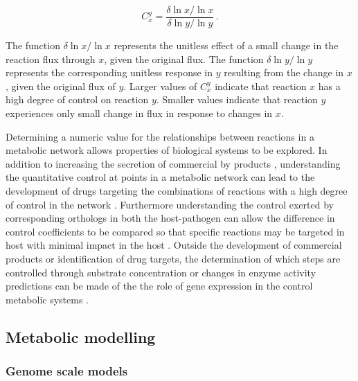 \begin{equation}\label{fcc}
C_{x}^{y} = \frac{ \delta \ln x / \ln x}{\delta \ln y / \ln y} \, .
\end{equation}

The function $\delta \ln x / \ln x$ represents the unitless effect of a small change in the reaction flux through $x$, given the original flux. The function $\delta \ln y / \ln y$ represents the corresponding unitless response in $y$ resulting from the change in $x$, given the original flux of $y$. Larger values of $C_{x}^{y}$ indicate that reaction $x$ has a high degree of control on reaction $y$. Smaller values indicate that reaction $y$ experiences only small change in flux in response to changes in $x$.


Determining a numeric value for the relationships between reactions in a metabolic network allows properties of biological systems to be explored. In addition to increasing the secretion of commercial by products \cite{niederberger1992}, understanding the quantitative control at points in a metabolic network can lead to the development of drugs targeting the combinations of reactions with a high degree of control in the network \cite{lehar2008,hopkins2008}. Furthermore understanding the control exerted by corresponding orthologs in both the host-pathogen can allow the difference in control coefficients to be compared so that specific reactions may be targeted in host with minimal impact in the host \cite{hornberg2007}. Outside the development of commercial products or identification of drug targets, the determination of which steps are controlled through substrate concentration or changes in enzyme activity predictions can be made of the the role of gene expression in the control metabolic systems \cite{rossell2006,daran-lapujade2007}.


\subsection{Metabolic modelling}

\subsubsection{Genome scale models}

